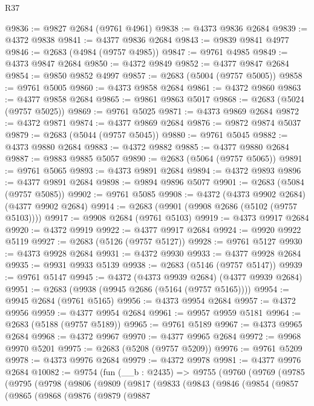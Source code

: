 \begin{lexlean}{R37}
\begin{coremodule}
@9836 := @9827 @2684 (@9761 @4961)
@9838 := @4373 @9836 @2684
@9839 := @4372 @9838
@9841 := @4377 @9836 @2684
@9843 := @9839 @9841 @4977
@9846 := @2683 (@4984 (@9757 @4985))
@9847 := @9761 @4985
@9849 := @4373 @9847 @2684
@9850 := @4372 @9849
@9852 := @4377 @9847 @2684
@9854 := @9850 @9852 @4997
@9857 := @2683 (@5004 (@9757 @5005))
@9858 := @9761 @5005
@9860 := @4373 @9858 @2684
@9861 := @4372 @9860
@9863 := @4377 @9858 @2684
@9865 := @9861 @9863 @5017
@9868 := @2683 (@5024 (@9757 @5025))
@9869 := @9761 @5025
@9871 := @4373 @9869 @2684
@9872 := @4372 @9871
@9874 := @4377 @9869 @2684
@9876 := @9872 @9874 @5037
@9879 := @2683 (@5044 (@9757 @5045))
@9880 := @9761 @5045
@9882 := @4373 @9880 @2684
@9883 := @4372 @9882
@9885 := @4377 @9880 @2684
@9887 := @9883 @9885 @5057
@9890 := @2683 (@5064 (@9757 @5065))
@9891 := @9761 @5065
@9893 := @4373 @9891 @2684
@9894 := @4372 @9893
@9896 := @4377 @9891 @2684
@9898 := @9894 @9896 @5077
@9901 := @2683 (@5084 (@9757 @5085))
@9902 := @9761 @5085
@9908 := @4372 (@4373 @9902 @2684) (@4377 @9902 @2684)
@9914 := @2683 (@9901 (@9908 @2686 (@5102 (@9757 @5103))))
@9917 := @9908 @2684 (@9761 @5103)
@9919 := @4373 @9917 @2684
@9920 := @4372 @9919
@9922 := @4377 @9917 @2684
@9924 := @9920 @9922 @5119
@9927 := @2683 (@5126 (@9757 @5127))
@9928 := @9761 @5127
@9930 := @4373 @9928 @2684
@9931 := @4372 @9930
@9933 := @4377 @9928 @2684
@9935 := @9931 @9933 @5139
@9938 := @2683 (@5146 (@9757 @5147))
@9939 := @9761 @5147
@9945 := @4372 (@4373 @9939 @2684) (@4377 @9939 @2684)
@9951 := @2683 (@9938 (@9945 @2686 (@5164 (@9757 @5165))))
@9954 := @9945 @2684 (@9761 @5165)
@9956 := @4373 @9954 @2684
@9957 := @4372 @9956
@9959 := @4377 @9954 @2684
@9961 := @9957 @9959 @5181
@9964 := @2683 (@5188 (@9757 @5189))
@9965 := @9761 @5189
@9967 := @4373 @9965 @2684
@9968 := @4372 @9967
@9970 := @4377 @9965 @2684
@9972 := @9968 @9970 @5201
@9975 := @2683 (@5208 (@9757 @5209))
@9976 := @9761 @5209
@9978 := @4373 @9976 @2684
@9979 := @4372 @9978
@9981 := @4377 @9976 @2684
@10082 := @9754
    (fun (__b : @2435) =>
    @9755
      (@9760
        (@9769
          (@9785
            (@9795
              (@9798
                (@9806
                  (@9809
                    (@9817
                      (@9833
                        (@9843
                          (@9846
                            (@9854
                              (@9857
                                (@9865
                                  (@9868
                                    (@9876
                                      (@9879
                                        (@9887

\end{coremodule}
\end{lexlean}
